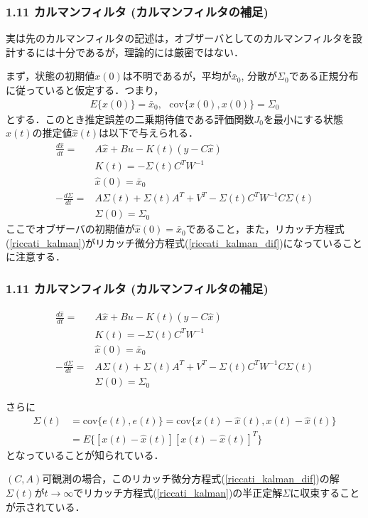 \begin{frame}[t]
\frametitle{1.11 カルマンフィルタ (カルマンフィルタの補足)}
実は先のカルマンフィルタの記述は，オブザーバとしてのカルマンフィルタを設計するには十分であるが，理論的には厳密ではない．

まず，状態の初期値$x(0)$は不明であるが，平均が$\bar{x}_0$, 分散が$\Sigma_0$である正規分布に従っていると仮定する．つまり，
\begin{align}
     E\{x(0) \} = \bar{x}_0, \ \ \ \mbox{cov} \{ x(0), x(0) \} = \Sigma_0
\end{align}
とする．このとき推定誤差の二乗期待値である評価関数$J_0$を最小にする状態$x(t)$の推定値$\hat{x}(t)$は以下で与えられる．
\begin{align}
 \frac{d \hat{x}}{dt} =& A \hat{x} + B u - K(t) (y - C \hat{x})
\\
 & K(t) = - \Sigma(t) C^T W^{-1}
\\
 & \hat{x}(0) = \bar{x}_0
\\
 - \frac{d \Sigma}{dt} = & A \Sigma(t) + \Sigma(t) A^T +  V ^T - \Sigma(t) C^T W^{-1} C \Sigma(t)
\label{riccati_kalman_dif}
\\
 & \Sigma(0) = \Sigma_0
\end{align}
ここでオブザーバの初期値が$\hat{x}(0)=\bar{x}_0$であること，また，リカッチ方程式(\ref{riccati_kalman})がリカッチ微分方程式(\ref{riccati_kalman_dif})になっていることに注意する．

\end{frame}


\begin{frame}[t]
\frametitle{1.11 カルマンフィルタ (カルマンフィルタの補足)}
\vspace*{-5mm}

\addtocounter{equation}{-5}
\begin{align}
 \frac{d \hat{x}}{dt} =& A \hat{x} + B u - K(t) (y - C \hat{x})
\\
 & K(t) = - \Sigma(t) C^T W^{-1}
\\
 & \hat{x}(0) = \bar{x}_0
\\
 - \frac{d \Sigma}{dt} = & A \Sigma(t) + \Sigma(t) A^T +  V ^T - \Sigma(t) C^T W^{-1} C \Sigma(t)
\label{riccati_kalman_dif}
\\
 & \Sigma(0) = \Sigma_0
\end{align}

さらに
\begin{align}
     \Sigma(t) &= \mbox{cov} \{ e(t), e(t) \} = \mbox{cov} \{ x(t)-\hat{x}(t),  x(t)-\hat{x}(t)\}
\nonumber\\
     &= E \{ [x(t)-\hat{x}(t)][x(t)-\hat{x}(t)]^T \}
\end{align}
となっていることが知られている．


$(C,A)$可観測の場合，このリカッチ微分方程式(\ref{riccati_kalman_dif})の解$\Sigma(t)$が$t \rightarrow \infty$でリカッチ方程式(\ref{riccati_kalman})の半正定解$\Sigma$に収束することが示されている．
\end{frame}


